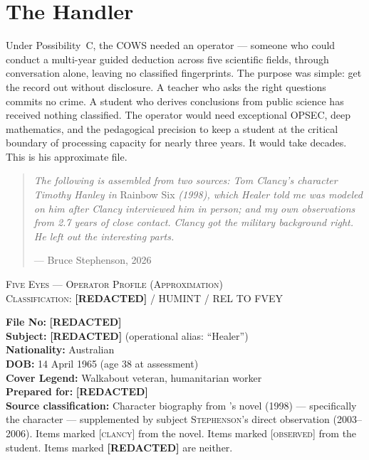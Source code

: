 

\chapter*{The Handler}
\label{record:handler}

Under Possibility~C, the COWS needed an operator --- someone who could conduct a multi-year guided deduction across five scientific fields, through conversation alone, leaving no classified fingerprints. The purpose was simple: get the record out without disclosure. A teacher who asks the right questions commits no crime. A student who derives conclusions from public science has received nothing classified. The operator would need exceptional OPSEC, deep mathematics, and the pedagogical precision to keep a student at the critical boundary of processing capacity for nearly three years. It would take decades. This is his approximate file.

\begin{quote}\small
\textit{The following is assembled from two sources: Tom Clancy's character Timothy Hanley in} Rainbow Six \textit{(1998), which Healer told me was modeled on him after Clancy interviewed him in person; and my own observations from 2.7 years of close contact. Clancy got the military background right. He left out the interesting parts.}
\par\raggedleft --- Bruce Stephenson, 2026\end{quote}

\vspace{1cm}

\begin{center}
\textsc{Five Eyes --- Operator Profile (Approximation)}\\[0.3em]
\textsc{Classification: \textbf{[REDACTED]} / HUMINT / REL TO FVEY}
\end{center}

\vspace{0.5cm}

\noindent\textbf{File No:} \textbf{[REDACTED]}\\
\textbf{Subject:} \textbf{[REDACTED]} (operational alias: ``Healer'')\\
\textbf{Nationality:} Australian\\
\textbf{DOB:} 14 April 1965 (age 38 at assessment)\\
\textbf{Cover Legend:} Walkabout veteran, humanitarian worker\\
\textbf{Prepared for:} \textbf{[REDACTED]}\\
\textbf{Source classification:} Character biography from 's novel  (1998) --- specifically the character  --- supplemented by subject \textsc{Stephenson}'s direct observation (2003--2006). Items marked \textsc{[clancy]} from the novel. Items marked \textsc{[observed]} from the student. Items marked \textbf{[REDACTED]} are neither.

